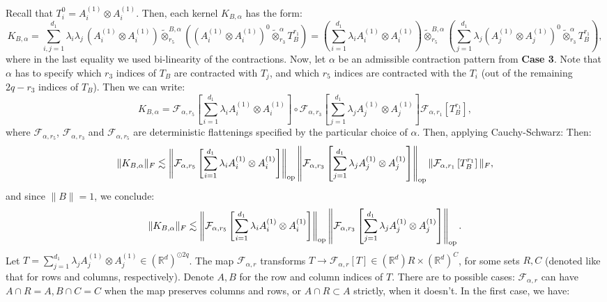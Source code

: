 \documentclass[]{article}
\numberwithin{equation}{section}
\theoremstyle{definition}
\newcommand{\RR}{\mathbb{R}}
\def\op{{\rm op}}
\begin{document}
Recall that $T_i^0 = A_{i}^{(1)} \otimes A_{i}^{(1)}$. Then, each kernel $K_{B,\alpha}$ has the form: 
\begin{equation}
    K_{B,\alpha} =\sum_{i,j=1}^{d_1}
\lambda_i\lambda_j\,(A_{i}^{(1)} \otimes A_{i}^{(1)})\tilde\otimes_{r_5}^{B,\alpha}\left((A_{i}^{(1)} \otimes A_{i}^{(1)})^0\tilde\otimes_{r_3}^{\alpha}
T_B^{r_1}
\right) =  (\sum_{i=1}^{d_1}
\lambda_iA_{i}^{(1)} \otimes A_{i}^{(1)})\tilde\otimes_{r_5}^{B,\alpha}\left(\sum_{j=1}^{d_1}
\lambda_j(A_{j}^{(1)} \otimes A_{j}^{(1)})^0\tilde\otimes_{r_3}^{\alpha}
T_B^{r_1}
\right),
\end{equation}
where in the last equality we used bi-linearity of the contractions. Now, let $\alpha$ be an admissible contraction pattern from \textbf{Case 3}. Note that $\alpha$ has to specify which $r_3$ indices of $T_{B}$ are contracted with $T_{j}$, and which $r_5$ indices are contracted with the $T_i$ (out of the remaining $2q-r_3$ indices of $T_{B}$). Then we can write: 
\begin{equation}
     K_{B,\alpha} = \mathcal{F}_{\alpha, r_5}\left [\sum_{i=1}^{d_1}
\lambda_i A_{i}^{(1)} \otimes A_{i}^{(1)} \right ] \circ  \mathcal{F}_{\alpha, r_3}\left [\sum_{j=1}^{d_1}
\lambda_j A_{j}^{(1)} \otimes A_{j}^{(1)} \right ] \mathcal{F}_{\alpha, r_1} \left [ 
T_B^{r_1} \right ],
\end{equation}
where $\mathcal{F}_{\alpha, r_5}$, $\mathcal{F}_{\alpha, r_3}$ and $\mathcal{F}_{\alpha, r_5}$ are deterministic flattenings specified by the particular choice of $\alpha$. Then, applying Cauchy-Schwarz:
Then:
\begin{equation}
    \|K_{B,\alpha}\|_F \lesssim \left \| \mathcal{F}_{\alpha, r_5}\left [\sum_{i=1}^{d_1}
\lambda_i A_{i}^{(1)} \otimes A_{i}^{(1)} \right ]\right \|_\op \left \|  \mathcal{F}_{\alpha, r_3}\left [\sum_{j=1}^{d_1}
\lambda_j A_{j}^{(1)} \otimes A_{j}^{(1)} \right ]\right \|_\op \| \mathcal{F}_{\alpha, r_1} \left [ 
T_B^{r_1} \right ] \|_{F},
\end{equation}
and since $\|B\|=1$, we conclude: 
\begin{equation}
    \|K_{B,\alpha}\|_F \lesssim \left \| \mathcal{F}_{\alpha, r_5}\left [\sum_{i=1}^{d_1}
\lambda_i A_{i}^{(1)} \otimes A_{i}^{(1)} \right ]\right \|_\op \left \|  \mathcal{F}_{\alpha, r_3}\left [\sum_{j=1}^{d_1}
\lambda_j A_{j}^{(1)} \otimes A_{j}^{(1)} \right ]\right \|_\op.
\end{equation}
Let $T = \sum_{j=1}^{d_1}
\lambda_j A_{j}^{(1)} \otimes A_{j}^{(1)} \in (\RR^{d})^{\odot 2q}$. The map $\mathcal{F}_{\alpha, r}$ transforms $T \to \mathcal{F}_{\alpha, r}[T] \in (\RR^d){R} \times (\RR^{d})^{C}$, for some sets $R, C$ (denoted like that for rows and columns, respectively). Denote $A, B$ for the row and column indices of $T$. There are to possible cases: $\mathcal{F}_{\alpha,r}$ can have $A \cap R = A, B \cap C= C$ when the map preserves columns and rows, or $A \cap R \subset A$ strictly, when it doesn't. In the first case, we have:
\end{document}
